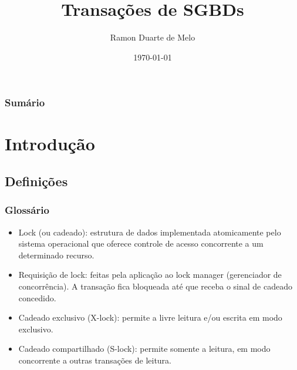 \documentclass{beamer}
\title[Transações]{Transações de SGBDs} %
\author{Ramon Duarte de Melo} %
\institute[UFRJ] %
{
Universidade Federal do Rio de Janeiro \\ %
\medskip
\textit{ramonduarte@poli.ufrj.br} %
}
\date{\today} %
\begin{document}
\begin{frame}
\titlepage %
\end{frame}

\begin{frame}
\frametitle{Sumário} %
\tableofcontents %
\end{frame}


\section{Introdução} %

\subsection{Definições} %

\begin{frame}
\frametitle{Glossário}
\begin{itemize}
    \item Lock (ou cadeado): estrutura de dados implementada atomicamente pelo sistema operacional que oferece controle de acesso concorrente a um determinado recurso.
    \item Requisição de lock: feitas pela aplicação ao lock manager (gerenciador de concorrência). A transação fica bloqueada até que receba o sinal de cadeado concedido.
    \item Cadeado exclusivo (X-lock): permite a livre leitura e/ou escrita em modo exclusivo.
    \item Cadeado compartilhado (S-lock): permite somente a leitura, em modo concorrente a outras transações de leitura.
\end{itemize}
\end{frame}
\end{document}

